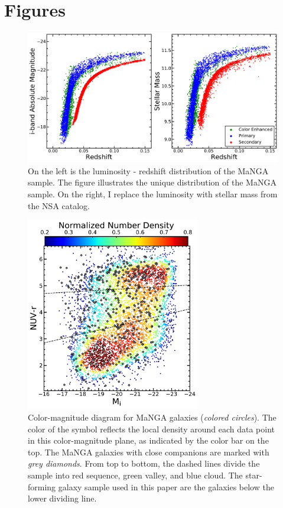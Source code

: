 \documentclass[iop,revtex4,twocolumn,apj,numberedappendix,appendixfloats]{emulateapj}
\begin{document}

\hbox{}\clearpage

\appendix

\section{Figures}

\begin{figure}
\centering
\includegraphics[width=\linewidth]{fig/Mi-z.pdf}
\caption[The luminosity - redshift distribution and mass - redshift distribution of the MaNGA sample.]{On the left is the luminosity - redshift distribution of the MaNGA sample. The figure illustrates the unique distribution of the MaNGA sample. On the right, I replace the luminosity with stellar mass from the NSA catalog.}
\label{fig:Mi-z}
\end{figure}

\begin{figure}
\centering
\includegraphics[width=3in]{fig/color-mag.pdf}
\caption[Color-magnitude distribution of the MaNGA galaxies]{Color-magnitude diagram for MaNGA galaxies ({\it colored circles}). The color of the symbol reflects the local density around each data point in this color-magnitude plane, as indicated by the color bar on the top. The MaNGA galaxies with close companions are marked with {\it grey diamonds}. From top to bottom, the dashed lines divide the sample into red sequence, green valley, and blue cloud. The star-forming galaxy sample used in this paper are the galaxies below the lower dividing line.}
\label{fig:CMD}
\end{figure}
\end{document}
